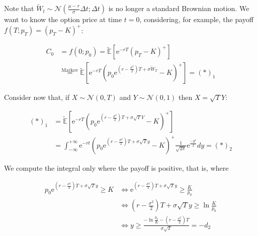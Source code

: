 \documentclass[oneside,titlepage,headinclude,12pt,a4paper,BCOR5mm,footinclude]{book}
\theoremstyle{defn}
\newcommand{\eexp}{\mathrm{e}}
\begin{document}
  Note  that $\tilde{W}_t  \sim \mathcal{N}\left(  \frac{\mu-r}{\sigma}\Delta t;
  \Delta t\right)$ is no longer a standard  Brownian motion. We want to know the
  option price at  time $t=0$, considering, for example, the  payoff $f(T;p_T) =
  (p_T - K)^+$:

  \begin{align*}
    C_0 & = f(0;p_0) = \mathbb{\tilde E}\left[\eexp^{-rT} (p_T - K)^+\right]
    \\ & \stackrel{\text{Markov}}{=} \mathbb{\tilde E}\left[ \eexp^{-rT} \left( 
    p_0 \eexp^{\left(r-\frac{\sigma^2}{2}\right)T + \sigma \tilde{W}_T}
    -K\right)^+\right] = (*)_1
  \end{align*}
   
  Consider now that, if $X  \sim \mathcal{N}(0,T)$ and $Y \sim \mathcal{N}(0,1)$
  then $X = \sqrt{T}Y$:

  \begin{align*}
    (*)_1 & = \mathbb{\tilde E}\left[ \eexp^{-rT} \left(p_0 \eexp^{\left(r-\frac{\sigma^2}{2}\right)T + \sigma\sqrt{T}Y}-K\right)^+\right]
    \\ & = \int_{-\infty}^{+\infty} \eexp^{-rt} \left(p_0 \eexp^{\left(r-\frac{\sigma^2}{2}\right)T + \sigma\sqrt{T}y}-K\right)^+
    \frac{1}{\sqrt{2\pi}} \eexp^{\frac{-y^2}{2}}dy = (*)_2
  \end{align*}

  We compute the integral only where the payoff is positive, that is, where

  \begin{align*}
    p_0 \eexp^{\left(r-\frac{\sigma^2}{2}\right)T + \sigma\sqrt{T}y} \geq K
    & \iff
    \eexp^{\left(r-\frac{\sigma^2}{2}\right)T + \sigma\sqrt{T}y} \geq \frac{K}{p_0}
    \\ & \iff \left(r-\frac{\sigma^2}{2}\right)T + \sigma\sqrt{T}y \geq \ln\frac{K}{p_0}
    \\ & \iff y \geq \frac{-\ln\frac{p_0}{K} -\left(r - \frac{\sigma^2}{2}\right)T}{\sigma\sqrt{T}} = -d_2
  \end{align*}
\end{document}
